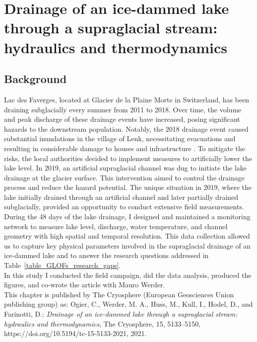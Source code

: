 \chapter{Drainage of an ice-dammed lake through a supraglacial stream: hydraulics and thermodynamics}
\label{ch:chapter_plainemorte}

\section{Background}

Lac des Faverges, located at Glacier de la Plaine Morte in Switzerland, has been draining subglacially every summer from 2011 to 2018. Over time, the volume and peak discharge of these drainage events have increased, posing significant hazards to the downstream population. Notably, the 2018 drainage event caused substantial inundations in the village of Lenk, necessitating evacuations and resulting in considerable damage to houses and infrastructure \citep{GemeindeLenk2019}. To mitigate the risks, the local authorities decided to implement measures to artificially lower the lake level. In 2019, an artificial supraglacial channel was dug to initiate the lake drainage at the glacier surface. This intervention aimed to control the drainage process and reduce the hazard potential. 
%
The unique situation in 2019, where the lake initially drained through an artificial channel and later partially drained subglacially, provided an opportunity to conduct extensive field measurements. During the 48 days of the lake drainage, I designed and maintained a monitoring network to measure lake level, discharge, water temperature, and channel geometry with high spatial and temporal resolution. This data collection allowed us to capture key physical parameters involved in the supraglacial drainage of an ice-dammed lake and to answer the research questions addressed in Table~\ref{table_GLOFs_research_gaps}.\\
%
In this study I conducted the field campaign, did the data analysis, produced the figures, and co-wrote the article with Mauro Werder.\\
%
This chapter is published by The Cryosphere (European Geosciences Union publishing
group) as: Ogier, C., Werder, M. A., Huss, M., Kull, I., Hodel, D., and Farinotti, D.: \textit{Drainage of an ice-dammed lake through a supraglacial stream: hydraulics and thermodynamics}, The Cryosphere, 15, 5133–5150, https://doi.org/10.5194/tc-15-5133-2021, 2021.

\clearpage

